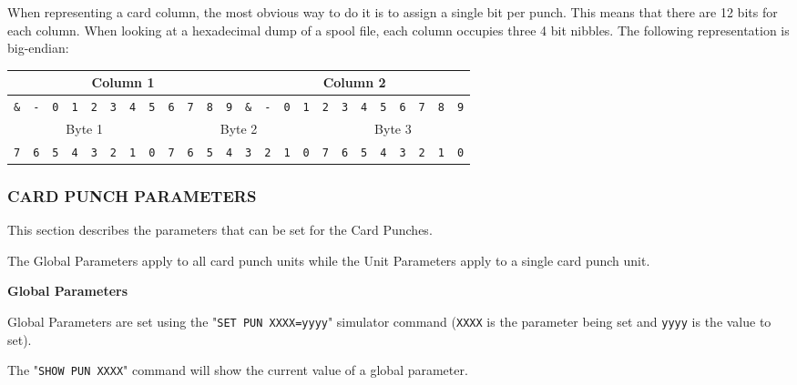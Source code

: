 When representing a card column, the most obvious way to do it is to assign a single bit per punch. This 
means that there are 12 bits for each column. When looking at a hexadecimal dump of a spool file, each column
occupies three 4 bit nibbles. The following representation is big-endian:

\begin{adjustwidth}{5ex}{1ex}
	\begin{tabular}{|c|c|c|c|c|c|c|c|c|c|c|c|c|c|c|c|c|c|c|c|c|c|c|c|}
        \multicolumn{12}{|c|}{Column 1} & \multicolumn{12}{|c|}{Column 2} \\
        \hline
        \texttt{\&} & \texttt{-} & \texttt{0} & \texttt{1} & \texttt{2} & \texttt{3} & \texttt{4} & \texttt{5} & \texttt{6} & \texttt{7} & \texttt{8} & \texttt{9} & \texttt{\&} & \texttt{-} & \texttt{0} & \texttt{1} & \texttt{2} & \texttt{3} & \texttt{4} & \texttt{5} & \texttt{6} & \texttt{7} & \texttt{8} & \texttt{9} \\
        \hline
        \multicolumn{8}{|c|}{Byte 1} & \multicolumn{8}{|c|}{Byte 2} & \multicolumn{8}{|c|}{Byte 3} \\
        \texttt{7} & \texttt{6} & \texttt{5} & \texttt{4} & \texttt{3} & \texttt{2} & \texttt{1} & \texttt{0} & \texttt{7} & \texttt{6} & \texttt{5} & \texttt{4} & \texttt{3} & \texttt{2} & \texttt{1} & \texttt{0} & \texttt{7} & \texttt{6} & \texttt{5} & \texttt{4} & \texttt{3} & \texttt{2} & \texttt{1} & \texttt{0} \\
	\end{tabular}
\end{adjustwidth}

\newpage

\subsubsection[Card Punch Parameters]{CARD PUNCH PARAMETERS}

This section describes the parameters that can be set for the Card Punches.

The Global Parameters apply to all card punch units while the Unit Parameters apply to a single card punch unit.

\textbf{Global Parameters}

Global Parameters are set using the "\texttt{SET PUN XXXX=yyyy}" simulator command (\texttt{XXXX} is the parameter being set
and \texttt{yyyy} is the value to set).

The "\texttt{SHOW PUN XXXX}" command will show the current value of a global parameter.

